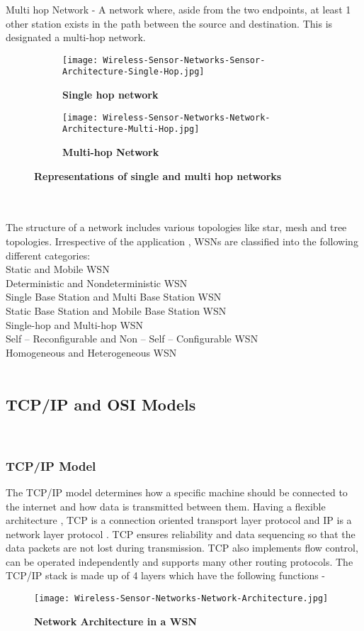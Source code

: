 \documentclass{article}
\begin{document}
Multi hop Network - A network where, aside from the two endpoints, at least 1 other station exists in the path between the source and destination. This is designated a multi-hop network.
\\
\begin{figure}
\centering
\begin{subfigure}{.5\textwidth}
  \centering
  \texttt{[image: Wireless-Sensor-Networks-Sensor-Architecture-Single-Hop.jpg]}
  \caption{\bf{Single hop network}}
  \label{fig:sub1}
\end{subfigure}%
\begin{subfigure}{.5\textwidth}
  \centering
  \texttt{[image: Wireless-Sensor-Networks-Network-Architecture-Multi-Hop.jpg]}
  \caption{\bf{Multi-hop Network}}
  \label{fig:sub2}
\end{subfigure}
\caption{\bf{Representations of single and multi hop networks}}
\label{fig:test}
\end{figure}
\\
\\
The structure of a network includes various topologies like star, mesh and tree topologies. Irrespective of the application , WSNs are classified into the following different categories:\\
Static and Mobile WSN\\
Deterministic and Nondeterministic WSN\\
Single Base Station and Multi Base Station WSN\\
Static Base Station and Mobile Base Station WSN\\
Single-hop and Multi-hop WSN\\
Self – Reconfigurable and Non – Self – Configurable WSN\\
Homogeneous and Heterogeneous WSN\\
\\
\subsection{TCP/IP and OSI Models}
\\
\subsubsection{TCP/IP Model}
The TCP/IP model determines how a specific machine should be connected to the internet and how data is transmitted between them.  Having a flexible architecture , TCP is a connection oriented transport layer protocol and IP is a network layer protocol . TCP ensures reliability and data sequencing so that the data packets are not lost during transmission. TCP also implements flow control, can be operated independently and supports many other routing protocols.
The TCP/IP stack is made up of 4 layers which have the following functions -
\\
\begin{figure}[h] 
\begin{center} 
\texttt{[image: Wireless-Sensor-Networks-Network-Architecture.jpg]}  
\caption{{\bf{Network Architecture in a WSN} }} 
\label{Network Architecture} 
\end{center} 
\end{figure}\\
\end{document}
